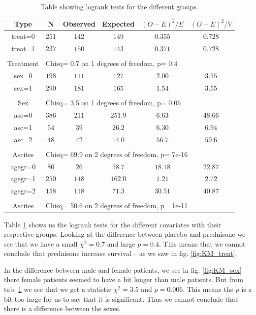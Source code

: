 \documentclass[a4paper,norsk, 10pt]{article}
\begin{document}
\begin{table}[!htb]
\centering
\begin{tabular}{c|c|c|c|c|c}
Type & N & Observed & Expected & $(O-E)^2/E$ & $(O-E)^2/V$ \\
\hline 
treat=0 & $251$ & $142$ &  $149$&  $0.355$&  $0.728$ \\
treat=1 & $237$ & $150$ &  $143$&  $0.371$&  $0.728$ \\
\hline\\
Treatment & \multicolumn{5}{l}{Chisq= 0.7  on 1 degrees of freedom, p= 0.4}\\
\hline
\hline
sex=0 & $198$ & $111$ &  $127$&  $2.00$&  $3.55$ \\
sex=1 & $290$ & $181$ &  $165$&  $1.54$&  $3.55$ \\
\hline\\
Sex & \multicolumn{5}{l}{Chisq= 3.5  on 1 degrees of freedom, p= 0.06}\\
\hline
\hline
asc=0 & $386$ & $211$ &  $251.9$&  $6.63$&  $48.66$ \\
asc=1 & $54$ & $39$ &  $26.2$&  $6.30$&  $6.94$ \\
asc=2 & $48$ & $42$ &  $14.0$&  $56.7$&  $59.6$ \\
\hline\\
Ascites & \multicolumn{5}{l}{Chisq= 69.9  on 2 degrees of freedom, p= 7e-16 }\\
\hline
\hline
agegr=0 & $80$ & $26$ &  $58.7$&  $18.18$&  $22.87$ \\
agegr=1 & $250$ & $148$ &  $162.0$&  $1.21$&  $2.72$ \\
agegr=2 & $158$ & $118$ &  $71.3$&  $30.51$&  $40.87$ \\
\hline\\
Ascites & \multicolumn{5}{l}{Chisq= 50.6  on 2 degrees of freedom, p= 1e-11}\\
\end{tabular}
\caption{Table showing logrank tests for the different groups.}\label{tab:logrank}
\end{table}


Table \ref{tab:logrank} shows us the logrank tests for the different covariates with their respective groups. Looking at the difference between placebo and prednisone we see that we have a small $\chi^2 = 0.7$ and large $p=0.4$. This means that we cannot conclude that prednisone increase survival -- as we saw in fig. \ref{fig:KM_treat}.

In the difference between male and female patients, we see in fig. \ref{fig:KM_sex} there female patients seemed to have a bit longer than male patients. But from tab. \ref{tab:logrank} we see that we get a statistic $\chi^2 = 3.5$ and $p=0.006$. This means the $p$ is a bit too large for us to say that it is significant. Thus we cannot conclude that there is a difference between the sexes.
\end{document}
